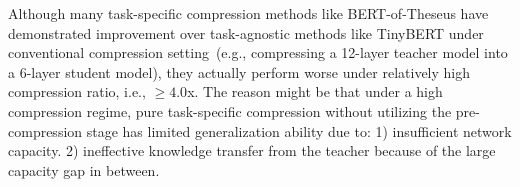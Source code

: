 \documentclass[letterpaper]{article} %
\begin{document}
	Although many task-specific compression methods like BERT-of-Theseus have demonstrated improvement over task-agnostic methods like TinyBERT under conventional compression setting~(e.g., compressing a 12-layer teacher model into a 6-layer student model), they actually perform worse under relatively high compression ratio, i.e., $\ge4.0$x. The reason might be that under a high compression regime, pure task-specific compression without utilizing the pre-compression stage has limited generalization ability due to: 1) insufficient network capacity. 2) ineffective knowledge transfer from the teacher because of the large capacity gap in between.
\end{document}
